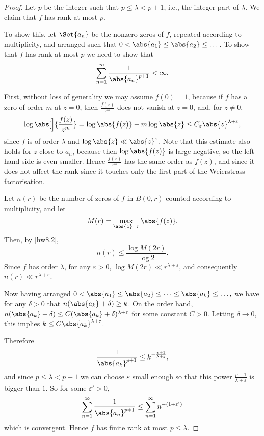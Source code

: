 \begin{proof}
	Let $p$ be the integer such that $p \leq \lambda < p + 1$, i.e., the integer part of $\lambda$.
	We claim that $f$ has rank at most $p$.

	To show this, let $\Set{a_n}$ be the nonzero zeros of $f$, repeated according to multiplicity, and arranged such that $0 < \abs{a_1} \leq \abs{a_2} \leq \dots$.
	To show that $f$ has rank at most $p$ we need to show that
	\[
		\sum_{n = 1}^\infty \frac{1}{\abs{a_n}^{p + 1}} < \infty.
	\]

	First, without loss of generality we may assume $f(0) = 1$, because if $f$ has a zero of order $m$ at $z = 0$, then $\frac{f(z)}{z^m}$ does not vanish at $z = 0$, and, for $z \neq 0$,
	\[
		\log \abs[\Big]{\frac{f(z)}{z^m}} = \log \abs{f(z)} - m \log\abs{z} \leq C_\varepsilon \abs{z}^{\lambda + \varepsilon},
	\]
	since $f$ is of order $\lambda$ and $\log \abs{z} \ll \abs{z}^\varepsilon$.
	Note that this estimate also holds for $z$ close to $a_n$, because then $\log \abs{f(z)}$ is large negative, so the left-hand side is even smaller.
	Hence $\frac{f(z)}{z^m}$ has the same order as $f(z)$, and since it does not affect the rank since it touches only the first part of the Weierstrass factorisation.

	Let $n(r)$ be the number of zeros of $f$ in $B(0, r)$ counted according to multiplicity, and let
	\[
		M(r) = \max_{\abs{z} = r} \abs{f(z)}.
	\]
	Then, by \autoref{hw8.2},
	\[
		n(r) \leq \frac{\log M(2 r)}{\log 2}.
	\]
	Since $f$ has order $\lambda$, for any $\varepsilon > 0$, $\log M(2 r) \ll r^{\lambda + \varepsilon}$, and consequently $n(r) \ll r^{\lambda + \varepsilon}$.

	Now having arranged $0 < \abs{a_1} \leq \abs{a_2} \leq \dots \leq \abs{a_k} \leq \dots,$ we have for any $\delta > 0$ that $n(\abs{a_k} + \delta) \geq k$.
	On the order hand, $n(\abs{a_k} + \delta) \leq C (\abs{a_k} + \delta)^{\lambda + \varepsilon}$ for some constant $C > 0$.
	Letting $\delta \to 0$, this implies $k \leq C \abs{a_k}^{\lambda + \varepsilon}$.

	Therefore
	\[
		\frac{1}{\abs{a_k}^{p + 1}} \leq k^{- \frac{p + 1}{\lambda + \varepsilon}},
	\]
	and since $p \leq \lambda < p + 1$ we can choose $\varepsilon$ small enough so that this power $\frac{p + 1}{\lambda + \varepsilon}$ is bigger than $1$.
	So for some $\varepsilon' > 0$,
	\[
		\sum_{n = 1}^\infty \frac{1}{\abs{a_n}^{p + 1}} \leq \sum_{n = 1}^\infty n^{-(1 + \varepsilon')}
	\]
	which is convergent.
	Hence $f$ has finite rank at most $p \leq \lambda$. \renewcommand{\qedsymbol}{}
\end{proof}
